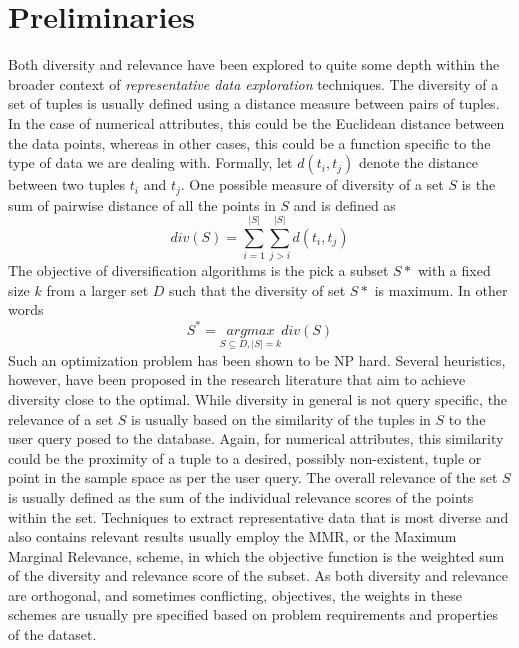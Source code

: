 \section{Preliminaries}
Both diversity and relevance have been explored to quite some depth within the broader context of \textit{representative data exploration} techniques. The diversity of a set of tuples is usually defined using a distance measure between pairs of tuples. In the case of numerical attributes, this could be the Euclidean distance between the data points, whereas in other cases, this could be a function specific to the type of data we are dealing with. Formally, let $d(t_i,t_j)$ denote the distance between two tuples $t_i$ and $t_j$. One possible measure of diversity of a set $S$ is the sum of pairwise distance of all the points in $S$ and is defined as
\begin{equation}div(S) = \sum_{i=1}^{|S|}\sum_{j>i}^{|S|}d(t_i,t_j)\end{equation}
The objective of diversification algorithms is the pick a subset $S*$ with a fixed size $k$ from a larger set $D$ such that the diversity of set $S*$ is maximum. In other words
\begin{equation}S^{*}=\underset{S\subseteq D, |S|=k}{argmax} div(S)\end{equation}
Such an optimization problem has been shown to be NP hard. Several heuristics, however, have been proposed in the research literature that aim to achieve diversity close to the optimal.
While diversity in general is not query specific, the relevance of a set $S$ is usually based on the similarity of the tuples in $S$ to the user query posed to the database. Again, for numerical attributes, this similarity could be the proximity of a tuple to a desired, possibly non-existent, tuple or point in the sample space as per the user query. The overall relevance of the set $S$ is usually defined as the sum of the individual relevance scores of the points within the set. 
Techniques to extract representative data that is most diverse and also contains relevant results usually employ the MMR, or the Maximum Marginal Relevance, scheme, in which the objective function is the weighted sum of the diversity and relevance score of the subset. As both diversity and relevance are orthogonal, and sometimes conflicting, objectives, the weights in these schemes are usually pre specified based on problem requirements and properties of the dataset.


